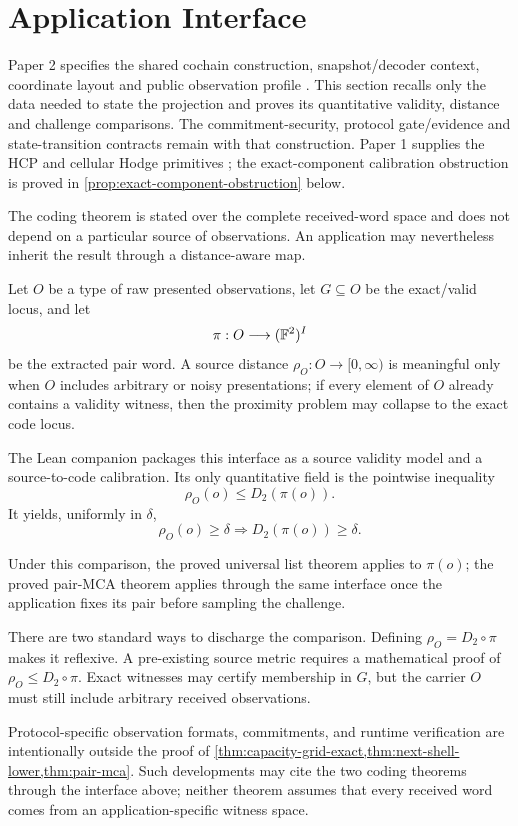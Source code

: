 \section{Application Interface}

Paper 2 specifies the shared cochain construction, snapshot/decoder context,
coordinate layout and public observation profile
\cite{vanDerVlugt2026protocol}. This section recalls only the data needed to
state the projection and proves its quantitative validity, distance and
challenge comparisons. The commitment-security, protocol gate/evidence and
state-transition contracts remain with that construction. Paper 1 supplies
the HCP and cellular Hodge primitives \cite{vanDerVlugt2026hcp}; the
exact-component calibration obstruction is proved in
\cref{prop:exact-component-obstruction} below.

The coding theorem is stated over the complete received-word space and does not
depend on a particular source of observations.  An application may nevertheless
inherit the result through a distance-aware map.

Let \(O\) be a type of raw presented observations, let
\(G\subseteq O\) be the exact/valid locus, and let
\[
  \pi:O\longrightarrow(\mathbb{F}^2)^I
\]
be the extracted pair word.  A source distance
\(\rho_O:O\to[0,\infty)\) is meaningful only when \(O\) includes arbitrary or noisy
presentations; if every element of \(O\) already contains a validity witness,
then the proximity problem may collapse to the exact code locus.

The Lean companion packages this interface as a source validity model and a
source-to-code calibration.  Its only quantitative field is the pointwise
inequality
\[
  \rho_O(o)\le D_2(\pi(o)).
\]
It yields, uniformly in \(\delta\),
\[
  \rho_O(o)\ge\delta
  \Longrightarrow
  D_2(\pi(o))\ge\delta.
\]

Under this comparison, the proved universal list theorem applies to
\(\pi(o)\); the proved pair-MCA theorem applies through the same interface
once the application fixes its pair before sampling the challenge.

There are two standard ways to discharge the comparison. Defining
\(\rho_O=D_2\circ\pi\) makes it reflexive. A pre-existing source
metric requires a mathematical proof of
\(\rho_O\le D_2\circ\pi\).  Exact witnesses may certify membership in \(G\),
but the carrier \(O\) must still include arbitrary received observations.

Protocol-specific observation formats, commitments, and runtime verification
are intentionally outside the proof of
\cref{thm:capacity-grid-exact,thm:next-shell-lower,thm:pair-mca}.
Such developments may cite the two coding theorems through the interface
above; neither theorem assumes that every received word comes from an
application-specific witness space.

